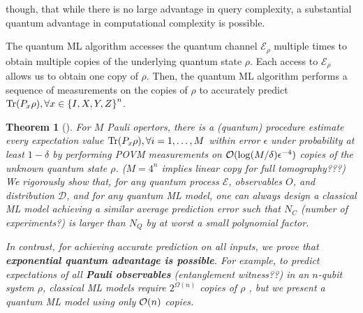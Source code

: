 \documentclass[
reprint,
aps,
pra,
]{revtex4-2}
\theoremstyle{plain}
\newtheorem{theorem}{Theorem}
\theoremstyle{definition}
\newcommand{\ob}{O}
\newcommand{\dm}{\rho}
\begin{document}
though, that while there is no large advantage in query complexity, a substantial quantum advantage in computational complexity is possible.

The quantum ML algorithm accesses the quantum channel $\mathcal{E}_\dm$ multiple times to obtain multiple copies of the underlying quantum state $\dm$. Each access to $\mathcal{E}_\dm$ allows us to obtain one copy of $\dm$. Then, the quantum ML algorithm performs a sequence of measurements on the copies of $\dm$ to accurately predict $\Tr(P_x \dm ), \forall x \in \qty{ I, X, Y, Z }^n$.

\begin{theorem}[\cite{huangInformationtheoreticBoundsQuantum2021}]\label{thm:quantum_ml_estimate_bound}
	For $M$ Pauli opertors, there is a (quantum) procedure estimate every expectation value $\Tr(P_x \dm),\forall i=1,\dots,M$ within error $\epsilon$ under probability at least $1-\delta $ by performing POVM measurements on $\mathcal{O}(\log(M/\delta)\epsilon^{-4})$ copies of the unknown quantum state $\dm$.
	($M=4^n$ implies linear copy for full tomography???)
	We rigorously show that, for any quantum process $\mathcal{E}$, observables $\ob$, and distribution $\mathcal{D}$, and for any quantum ML model, one can always design a classical ML model achieving a similar average prediction error such that $N_C$ (number of experiments?) is larger than $N_Q$ by at worst a small polynomial factor.

	In contrast, for achieving accurate prediction on all inputs, we prove that \textbf{exponential quantum advantage is possible}. For example, to predict expectations of all \textbf{Pauli observables} (entanglement witness??) in an $n$-qubit system $\dm$, classical ML models require $2^{\Omega(n)}$ copies of $\dm$ , but we present a quantum ML model using only $\mathcal{O}(n)$ copies.
\end{theorem}
\cite{huangPredictingManyProperties2020}
\cite{huangInformationtheoreticBoundsQuantum2021}
\cite{huangPowerDataQuantum2021}
\cite{aaronsonShadowTomographyQuantum2018}
\end{document}
